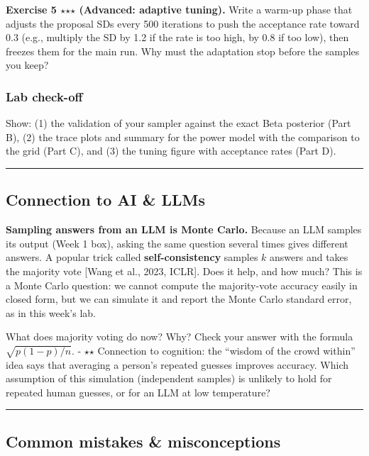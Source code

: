 \textbf{Exercise 5 \ensuremath{\star}\ensuremath{\star}\ensuremath{\star} (Advanced: adaptive tuning).} Write a warm-up
phase that adjusts the proposal SDs every 500 iterations to push the
acceptance rate toward 0.3 (e.g., multiply the SD by 1.2 if the rate is
too high, by 0.8 if too low), then freezes them for the main run. Why
must the adaptation stop before the samples you keep?

\subsubsection{Lab check-off}

Show: (1) the validation of your sampler against the exact Beta
posterior (Part B), (2) the trace plots and summary for the power model
with the comparison to the grid (Part C), and (3) the tuning figure with
acceptance rates (Part D).

\begin{center}\rule{0.5\linewidth}{0.5pt}\end{center}

\subsection{Connection to AI \& LLMs}

\textbf{Sampling answers from an LLM is Monte Carlo.} Because an LLM
samples its output (Week 1 box), asking the same question several times
gives different answers. A popular trick called
\textbf{self-consistency} samples \(k\) answers and takes the majority
vote {[}Wang et al., 2023, ICLR{]}. Does it help, and how much? This is
a Monte Carlo question: we cannot compute the majority-vote accuracy
easily in closed form, but we can simulate it and report the Monte Carlo
standard error, as in this week's lab.

What does majority voting do now? Why? Check your answer with the
formula \(\sqrt{p(1-p)/n}\). - \ensuremath{\star}\ensuremath{\star} Connection to cognition: the ``wisdom
of the crowd within'' idea says that averaging a person's repeated
guesses improves accuracy. Which assumption of this simulation
(independent samples) is unlikely to hold for repeated human guesses, or
for an LLM at low temperature?

\begin{center}\rule{0.5\linewidth}{0.5pt}\end{center}

\subsection{Common mistakes \& misconceptions}

